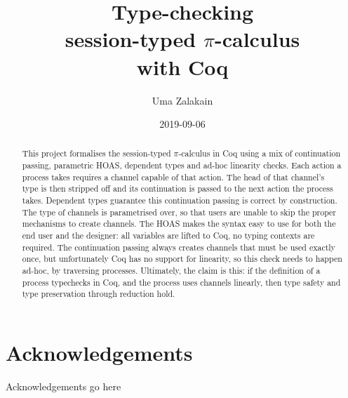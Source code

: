 \documentclass{mproj}
\newcommand{\picalc}{$\pi$-calculus}
\begin{document}
\title{Type-checking\\ session-typed \picalc \\ with Coq}
\author{Uma Zalakain}
\date{2019-09-06}
\maketitle

\begin{abstract}
    This project formalises the session-typed \picalc{} in Coq using a mix of continuation passing, parametric HOAS, dependent types and ad-hoc linearity checks. Each action a process takes requires a channel capable of that action. The head of that channel's type is then stripped off and its continuation is passed to the next action the process takes. Dependent types guarantee this continuation passing is correct by construction. The type of channels is parametrised over, so that users are unable to skip the proper mechanisms to create channels. The HOAS makes the syntax easy to use for both the end user and the designer: all variables are lifted to Coq, no typing contexts are required. The continuation passing always creates channels that must be used exactly once, but unfortunately Coq has no support for linearity, so this check needs to happen ad-hoc, by traversing processes. Ultimately, the claim is this: if the definition of a process typechecks in Coq, and the process uses channels linearly, then type safety and type preservation through reduction hold.
\end{abstract}

\educationalconsent
\vfill{}
\doclicenseThis
\newpage

\section*{Acknowledgements}

Acknowledgements go here

\tableofcontents
\end{document}
